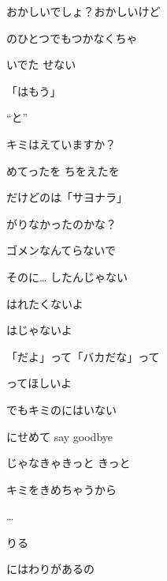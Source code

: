 \documentclass[14pt]{extreport}
\begin{document}
{\item
  おかしいでしょ？おかしいけど
  \jisho{}

  のひとつでもつかなくちゃ
  \jisho{}

  いでた せない
  \jisho{}

  「はもう」
  \jisho{}

\item
  ``と''
  \jisho{}

  キミはえていますか？
  \jisho{}

  めてったを ちをえたを
  \jisho{}

  だけどのは「サヨナラ」
  \jisho{}

  がりなかったのかな？
  \jisho{}

  ゴメンなんてらないで
  \jisho{}

  そのに… したんじゃない
  \jisho{}

\item
  はれたくないよ
  \jisho{}

  はじゃないよ
  \jisho{}

  「だよ」って「バカだな」って
  \jisho{}

  ってほしいよ
  \jisho{}

  でもキミのにはいない
  \jisho{}

  にせめて say goodbye
  \jisho{}

  じゃなきゃきっと きっと
  \jisho{}

  キミをきめちゃうから
  \jisho{}

  \ldots

\item
   りる
  \jisho{}

    にはわりがあるの
  \jisho{}

}
\end{document}
